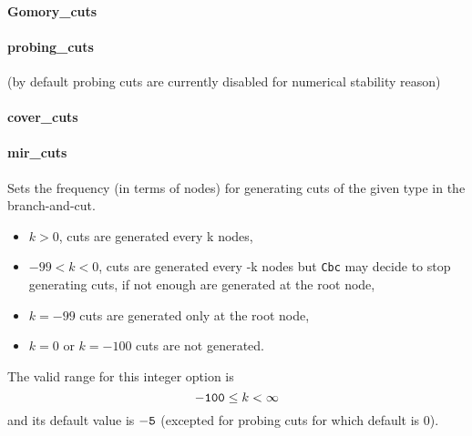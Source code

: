 \paragraph{Gomory\_cuts}
\label{Gomory_cuts}
\paragraph{probing\_cuts}(by default probing cuts are currently disabled for numerical stability reason)
\paragraph{cover\_cuts}
\label{cover_cuts}
\paragraph{mir\_cuts}
\label{mir_cuts}
Sets the frequency (in terms of nodes) for generating cuts of
the given type in the branch-and-cut.
\begin{itemize}
\item $k > 0$, cuts are generated every k nodes,
\item $-99 < k < 0$,  cuts are generated every -k nodes but
{\tt Cbc} may decide to stop generating cuts, if not
enough are generated at the root node,
\item$k = -99$ cuts are generated only at the root node,
\item $k = 0$ or $k = -100$ cuts are not generated.
\end{itemize}
 The valid range for this integer option is
$${\tt -100} \le k <  \infty$$
and its default value is ${\tt -5}$ (excepted for probing
cuts for which default is 0).
